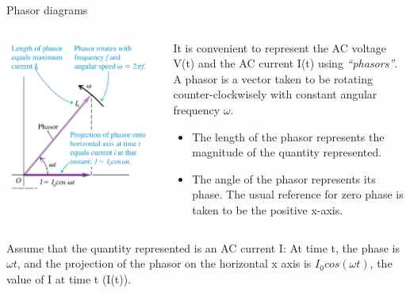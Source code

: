 %
%
%

\begin{frame}{Phasor diagrams}

\begin{columns}
  \begin{column}{0.45\textwidth}
    \begin{center}
       \includegraphics[width=0.96\textwidth]{./images/schematics/phasor_diagrams.png}\\
     \end{center}
  \end{column}
  \begin{column}{0.55\textwidth}
     It is convenient to represent the AC voltage V(t) and the AC current I(t) using {\em ``phasors''}.
     A phasor is a vector taken to be rotating counter-clockwisely with constant angular frequency $\omega$.
     \begin{itemize}
        \item The length of the phasor represents the magnitude of the quantity represented.
        \item The angle of the phasor represents its phase.
                  The usual reference for zero phase is taken to be the positive x-axis.
     \end{itemize}
  \end{column}
\end{columns}

\vspace{0.4cm}
Assume that the quantity represented is an AC current I:
At time t, the phase is $\omega  t$, and the projection of the phasor on the horizontal x axis
is $I_0 cos(\omega t)$, the value of I at time t (I(t)).

\end{frame}

